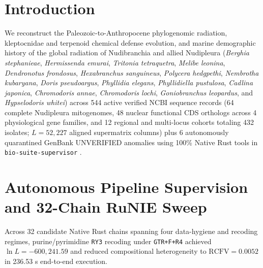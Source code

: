 \documentclass[10pt,letterpaper]{article}
\begin{document}
\section{Introduction}
We reconstruct the Paleozoic-to-Anthropocene phylogenomic radiation, kleptocnidae and terpenoid chemical defense evolution, and marine demographic history of the global radiation of Nudibranchia and allied Nudipleura (\textit{Berghia stephanieae}, \textit{Hermissenda emurai}, \textit{Tritonia tetraquetra}, \textit{Melibe leonina}, \textit{Dendronotus frondosus}, \textit{Hexabranchus sanguineus}, \textit{Polycera hedgpethi}, \textit{Nembrotha kubaryana}, \textit{Doris pseudoargus}, \textit{Phyllidia elegans}, \textit{Phyllidiella pustulosa}, \textit{Cadlina japonica}, \textit{Chromodoris annae}, \textit{Chromodoris lochi}, \textit{Goniobranchus leopardus}, and \textit{Hypselodoris whitei}) across 544 active verified NCBI sequence records (64 complete Nudipleura mitogenomes, 48 nuclear functional CDS orthologs across 4 physiological gene families, and 12 regional and multi-locus cohorts totaling 432 isolates; $L = 52,227$ aligned supermatrix columns) plus 6 autonomously quarantined GenBank UNVERIFIED anomalies using 100\% Native Rust tools in \texttt{bio-suite-supervisor} \cite{ref1,ref2,ref3}.
\section{Autonomous Pipeline Supervision and 32-Chain RuNIE Sweep}
Across 32 candidate Native Rust chains spanning four data-hygiene and recoding regimes, purine/pyrimidine \texttt{RY3} recoding under \texttt{GTR+F+R4} achieved $\ln L = -600,241.59$ and reduced compositional heterogeneity to $\mathrm{RCFV} = 0.0052$ in 236.53 s end-to-end execution.
\end{document}
